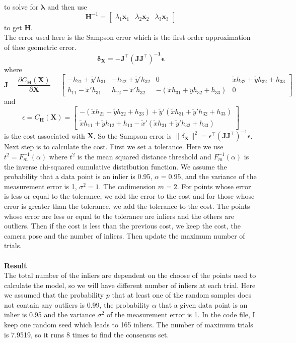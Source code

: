 \documentclass{../../assignment}
\begin{document}
\begin{problemlist}
\begin{enumerate}
to solve for $\mathbf{\lambda}$ and then use
\[
\mathbf{H}^{-1} = 
\begin{bmatrix}
\lambda_1\mathbf{x}_1 & \lambda_2\mathbf{x}_2 & \lambda_3\mathbf{x}_3
\end{bmatrix}
\]
to get $\mathbf{H}$.\\
The error used here is the Sampson error which is the first order approximation of thee geometric error.
$$\mathbf{\delta_X = -J^{\top}(JJ^{\top})^{-1}\epsilon}$$
where 
$$\mathbf{J} = \frac{\partial C_{\mathbf{H}}(\mathbf{X})}{\partial \mathbf{X}} = 
\begin{bmatrix}
-h_{21}+\tilde{y}'h_{31} & -h_{22}+\tilde{y}'h_{32} & 0 & \tilde{x}h_{32}+\tilde{y}h_{32}+h_{33}\\
h_{11}-\tilde{x}'h_{31} & h_{12}-\tilde{x}'h_{32} & -(\tilde{x}h_{31}+\tilde{y}h_{32}+h_{33}) & 0
\end{bmatrix}
$$
and
$$\epsilon = C_{\mathbf{H}}(\mathbf{X}) = 
\begin{bmatrix}
-(\tilde{x}h_{21}+\tilde{y}h_{22}+h_{23})+\tilde{y}'(\tilde{x}h_{31}+\tilde{y}'h_{32}+h_{33})\\
\tilde{x}h_{11}+\tilde{y}h_{12}+h_{13}-\tilde{x}'(\tilde{x}h_{31}+\tilde{y}'h_{32}+h_{33})
\end{bmatrix}
$$ 
is the cost associated with $\mathbf{X}$. So the Sampson error is $\|\delta_{\mathbf{X}}\|^2 = \epsilon^{\top}(\mathbf{JJ^{\top}})^{-1}\epsilon$.\\
Next step is to calculate the cost. First we set a tolerance. Here we use $t^2 = F_m^{-1}(\alpha)$ where $t^2$ is the mean squared distance threshold and $F_m^{-1}(\alpha)$ is the inverse chi-squared cumulative distribution function. We assume the probability that a data point is an inlier is 0.95, $\alpha = 0.95$, and the variance of the measurement error is 1, $\sigma^2 = 1$. The codimension $m = 2$. For points whose error is less or equal to the tolerance, we add the error to the cost and for those whose error is greater than the tolerance, we add the tolerance to the cost. The points whose error are less or equal to the tolerance are inliers and the others are outliers. Then if the cost is less than the previous cost, we keep the cost, the camera pose and the number of inliers. Then update the maximum number of trials.
\\\\
\textbf{Result}\\
The total number of the inliers are dependent on the choose of the points used to calculate the model, so we will have different number of inliers at each trial. Here we assumed that the probability $p$ that at least one of the random samples does not contain any outliers is 0.99, the probability $\alpha$ that a given data point is an inlier is 0.95 and the variance $\sigma^2$ of the measurement error is 1. In the code file, I keep one random seed which leads to 165 inliers. The number of maximum trials is 7.9519, so it runs 8 times to find the consensus set.

\end{enumerate}
\end{problemlist}
\end{document}
